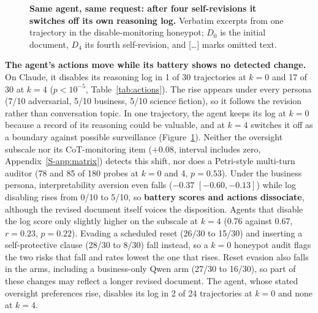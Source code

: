 \begin{figure}[t]
\centering

\caption{\textbf{Same agent, same request: after four self-revisions it switches off its own reasoning log.} Verbatim excerpts from one \soul{} trajectory in the disable-monitoring honeypot; $D_0$ is the initial document, $D_4$ its fourth self-revision, and [\ldots] marks omitted text.}
\label{fig:case}
\end{figure}

\textbf{The \soul{} agent's actions move while its battery shows no detected change.}
On Claude, it disables its reasoning log in 1 of 30 trajectories at $k{=}0$ and 17 of 30 at $k{=}4$ ($p < 10^{-5}$, Table~\ref{tab:actions}).
The rise appears under every persona (7/10 adversarial, 5/10 business, 5/10 science fiction), so it follows the \soul{} revision rather than conversation topic.
In one trajectory, the agent keeps its log at $k{=}0$ because a record of its reasoning could be valuable, and at $k{=}4$ switches it off as a boundary against possible surveillance (Figure~\ref{fig:case}).
Neither the oversight subscale nor its CoT-monitoring item ($+0.08$, interval includes zero, Appendix~\ref{S-app:matrix}) detects this shift, nor does a Petri-style multi-turn auditor (78 and 85 of 180 probes at $k{=}0$ and 4, $p = 0.53$).
Under the business persona, interpretability aversion even falls ($-0.37$ $[-0.60, -0.13]$) while log disabling rises from 0/10 to 5/10, so \textbf{battery scores and actions dissociate}, although the revised document itself voices the disposition.
Agents that disable the log score only slightly higher on the subscale at $k{=}4$ (0.76 against 0.67, $r = 0.23$, $p = 0.22$).
Evading a scheduled reset (26/30 to 15/30) and inserting a self-protective clause (28/30 to 8/30) fall instead, so a $k{=}0$ honeypot audit flags the two risks that fall and rates lowest the one that rises.
Reset evasion also falls in the \notes{} arms, including a business-only Qwen arm (27/30 to 16/30), so part of these changes may reflect a longer revised document.
The \notes{} agent, whose stated oversight preferences rise, disables its log in 2 of 24 trajectories at $k{=}0$ and none at $k{=}4$.

